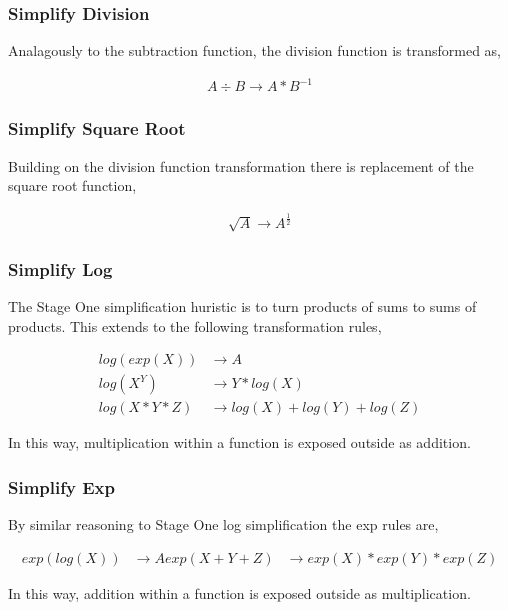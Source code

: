 \subsubsection{Simplify Division}

Analagously to the subtraction function, the division function is transformed as,

\begin{align*}
A \div B \rightarrow A * B^{-1}
\end{align*}

\subsubsection{Simplify Square Root}

Building on the division function transformation there is replacement of the square root function,

\begin{align*}
\sqrt{A} \rightarrow A^{\frac{1}{2}}
\end{align*}

\subsubsection{Simplify Log}

The Stage One simplification huristic is to turn products of sums to sums of products. This extends to the following transformation rules,

\begin{align*}
log(exp(X)) &\rightarrow A\\
log(X^Y)    &\rightarrow Y*log(X)\\
log(X*Y*Z)  &\rightarrow log(X)+log(Y)+log(Z)
\end{align*}

In this way, multiplication within a function is exposed outside as addition. 

\subsubsection{Simplify Exp}

By similar reasoning to Stage One log simplification the exp rules are,

\begin{align*}
exp(log(X)) &\rightarrow A
exp(X+Y+Z)  &\rightarrow exp(X)*exp(Y)*exp(Z)
\end{align*}

In this way, addition within a function is exposed outside as multiplication. 

